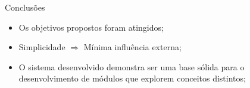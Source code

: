 \begin{frame}{Conclus\~{o}es}
	\begin{itemize}
		\item Os objetivos propostos foram atingidos;
		\item Simplicidade $\Rightarrow$ M\'{i}nima influ\^{e}ncia externa;
		\item O sistema desenvolvido demonstra ser uma base s\'{o}lida para o desenvolvimento de m\'{o}dulos que explorem conceitos distintos;
	\end{itemize}
\end{frame}